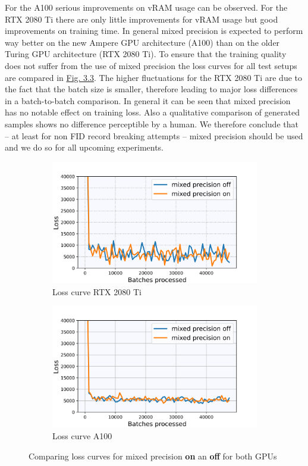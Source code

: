 For the A100 serious improvements on vRAM usage can be observed. For the RTX 2080 Ti there are only little improvements for vRAM usage but good improvements on training time. In general mixed precision is expected to perform way better on the new Ampere GPU
architecture (A100) than on the older Turing GPU architecture (RTX 2080 Ti). To ensure that the training quality does not suffer from the use of mixed precision the loss curves for all test setups are compared in \hyperref[fig:3.3]{Fig. 3.3}. The higher fluctuations for the RTX 2080 Ti are due to the fact that the batch size is smaller, therefore leading to major loss differences in a batch-to-batch comparison. In general it can be seen that mixed precision has no notable effect on training loss. Also a qualitative comparison of generated samples shows no difference perceptible by a human. We therefore conclude that – at least for non FID record breaking attempts – mixed precision should be used and we do so for all upcoming experiments.
%
\begin{figure} \label{fig:3.3}
    \centering
    \begin{subfigure}[b]{0.49\textwidth}
        \centering
         \includegraphics[width=\textwidth]{Chapters/figures/mixed_prec_rtx2080_loss.jpg}
         \caption{Loss curve RTX 2080 Ti}
    \end{subfigure}
    \begin{subfigure}[b]{0.49\textwidth}
        \centering
         \includegraphics[width=\textwidth]{Chapters/figures/mixed_prec_a100_loss.jpg}
         \caption{Loss curve A100}
    \end{subfigure}
    \caption{Comparing loss curves for mixed precision \textbf{on} an \textbf{off} for both GPUs}
\end{figure}
%
